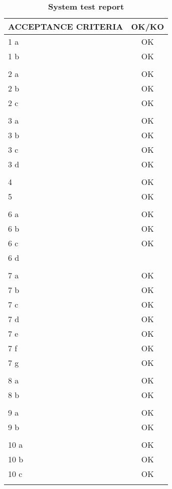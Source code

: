 \documentclass{article}
\begin{document}
\begin{table}
    \centering
\caption{\textbf{System test report}}
\label{tab:my_label}
    \begin{tabular}{|l|c|} \hline 
         \textbf{ACCEPTANCE CRITERIA}&\textbf{OK/KO}\\ \hline 
         1 a&OK\\ \hline 
         1 b&OK\\ \hline 
         &\\ \hline 
         2 a&OK\\ \hline 
         2 b&OK\\ \hline 
         2 c&OK\\ \hline 
         & \\ \hline 
         3 a& OK\\ \hline 
         3 b& OK\\ \hline 
         3 c& OK\\ \hline 
         3 d& OK\\ \hline 
         & \\ \hline 
         4& OK\\ \hline 
         5& OK\\ \hline 
         & \\ \hline 
         6 a&OK\\ \hline 
         6 b&OK\\ \hline 
         6 c&OK\\ \hline
         6 d&\\\hline
         & \\ \hline 
         7 a&OK\\ \hline 
         7 b&OK\\ \hline 
         7 c&OK\\ \hline
         7 d&OK\\ \hline
         7 e&OK\\ \hline 
         7 f&OK\\ \hline 
         7 g&OK\\ \hline
         &\\ \hline
         8 a&OK\\ \hline 
         8 b&OK\\ \hline 
         &\\ \hline
         9 a&OK\\ \hline 
         9 b&OK\\ \hline 
         &\\ \hline 
         10 a&OK\\ \hline 
         10 b&OK\\ \hline 
         10 c&OK\\ \hline 
 &\\\hline
    \end{tabular}
    
\end{table}
\end{document}
